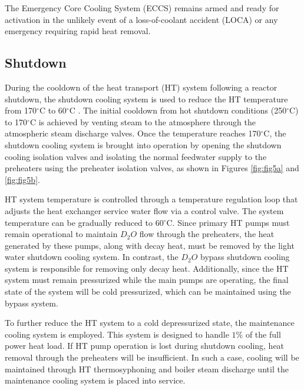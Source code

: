 \documentclass[12pt]{article}
\begin{document}
\begin{multicols}{2}
The Emergency Core Cooling System (ECCS) remains armed and ready for activation in the unlikely event of a loss-of-coolant accident (LOCA) or any emergency requiring rapid heat removal.

\subsection{Shutdown}

During the cooldown of the heat transport (HT) system following a reactor shutdown, the shutdown cooling system is used to reduce the HT temperature from 170$^{\circ}$C to 60$^{\circ}$C \cite{boiler}. The initial cooldown from hot shutdown conditions (250$^{\circ}$C) to 170$^{\circ}$C is achieved by venting steam to the atmosphere through the atmospheric steam discharge valves. Once the temperature reaches 170$^{\circ}$C, the shutdown cooling system is brought into operation by opening the shutdown cooling isolation valves and isolating the normal feedwater supply to the preheaters using the preheater isolation valves, as shown in Figures \ref{fig:fig5a} and \ref{fig:fig5b}.

HT system temperature is controlled through a temperature regulation loop that adjusts the heat exchanger service water flow via a control valve. The system temperature can be gradually reduced to 60$^{\circ}$C. Since primary HT pumps must remain operational to maintain $D_2O$ flow through the preheaters, the heat generated by these pumps, along with decay heat, must be removed by the light water shutdown cooling system. In contrast, the $D_2O$ bypass shutdown cooling system is responsible for removing only decay heat. Additionally, since the HT system must remain pressurized while the main pumps are operating, the final state of the system will be cold pressurized, which can be maintained using the bypass system.

To further reduce the HT system to a cold depressurized state, the maintenance cooling system is employed. This system is designed to handle $1\%$ of the full power heat load. If HT pump operation is lost during shutdown cooling, heat removal through the preheaters will be insufficient. In such a case, cooling will be maintained through HT thermosyphoning and boiler steam discharge until the maintenance cooling system is placed into service.
    
\end{multicols}
\end{document}
